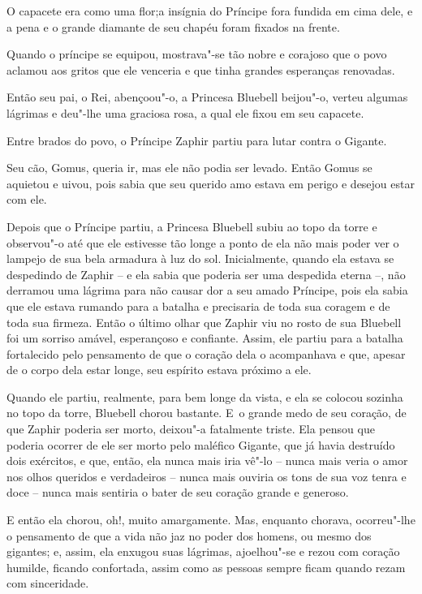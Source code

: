 O capacete era como uma flor;a insígnia do Príncipe fora fundida em cima
dele, e a pena e o grande diamante de seu chapéu foram fixados na
frente.

Quando o príncipe se equipou, mostrava"-se tão nobre e corajoso que o
povo aclamou aos gritos que ele venceria e que tinha grandes esperanças
renovadas.

Então seu pai, o Rei, abençoou"-o, a Princesa Bluebell beijou"-o, verteu
algumas lágrimas e deu"-lhe uma graciosa rosa, a qual ele fixou em seu
capacete.

Entre brados do povo, o Príncipe Zaphir partiu para lutar contra o
Gigante.

Seu cão, Gomus, queria ir, mas ele não podia ser levado. Então Gomus se
aquietou e uivou, pois sabia que seu querido amo estava em perigo e
desejou estar com ele.

Depois que o Príncipe partiu, a Princesa Bluebell subiu ao topo da torre
e observou"-o até que ele estivesse tão longe a ponto de ela não mais
poder ver o lampejo de sua bela armadura à luz do sol. Inicialmente,
quando ela estava se despedindo de Zaphir -- e ela sabia que poderia ser
uma despedida eterna --, não derramou uma lágrima para não causar dor a
seu amado Príncipe, pois ela sabia que ele estava rumando para a batalha
e precisaria de toda sua coragem e de toda sua firmeza. Então o último
olhar que Zaphir viu no rosto de sua Bluebell foi um sorriso amável,
esperançoso e confiante. Assim, ele partiu para a batalha fortalecido
pelo pensamento de que o coração dela o acompanhava e que, apesar de o
corpo dela estar longe, seu espírito estava próximo a ele.

Quando ele partiu, realmente, para bem longe da vista, e ela se colocou
sozinha no topo da torre, Bluebell chorou bastante. E~o grande medo de
seu coração, de que Zaphir poderia ser morto, deixou"-a fatalmente
triste. Ela pensou que poderia ocorrer de ele ser morto pelo maléfico
Gigante, que já havia destruído dois exércitos, e que, então, ela nunca
mais iria vê"-lo -- nunca mais veria o amor nos olhos queridos e
verdadeiros -- nunca mais ouviria os tons de sua voz tenra e doce --
nunca mais sentiria o bater de seu coração grande e generoso.

E então ela chorou, oh!, muito amargamente. Mas, enquanto chorava,
ocorreu"-lhe o pensamento de que a vida não jaz no poder dos homens, ou
mesmo dos gigantes; e, assim, ela enxugou suas lágrimas, ajoelhou"-se e
rezou com coração humilde, ficando confortada, assim como as pessoas
sempre ficam quando rezam com sinceridade.

